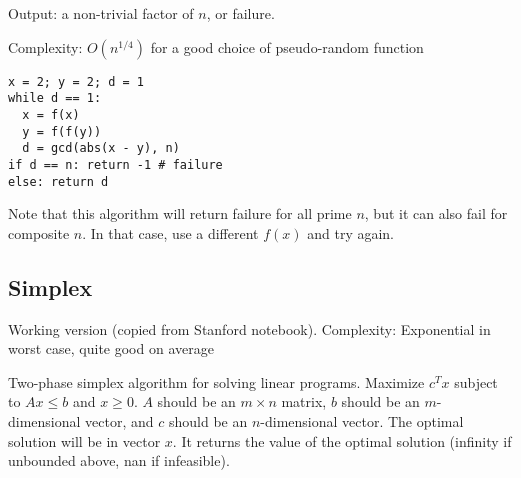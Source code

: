 \documentclass[letterpaper]{article}
\begin{document}
Output: a non-trivial factor of $n$, or failure.

Complexity: $O(n^{1/4})$ for a good choice of pseudo-random function

\begin{lstlisting}
x = 2; y = 2; d = 1
while d == 1:
  x = f(x)
  y = f(f(y))
  d = gcd(abs(x - y), n)
if d == n: return -1 # failure
else: return d
\end{lstlisting}

Note that this algorithm will return failure for all prime $n$, but it can also fail for composite $n$. In that case, use a different $f(x)$ and try again.

\subsection{Simplex}

Working version (copied from Stanford notebook). Complexity: Exponential in worst case, quite good on average

Two-phase simplex algorithm for solving linear programs. Maximize $c^T x$ subject to $Ax \leq b$ and $x \geq 0$. $A$ should be an $m\times n$ matrix, $b$ should be an $m$-dimensional vector, and $c$ should be an $n$-dimensional vector. The optimal solution will be in vector $x$. It returns the value of the optimal solution (infinity if unbounded above, nan if infeasible).
\end{document}
